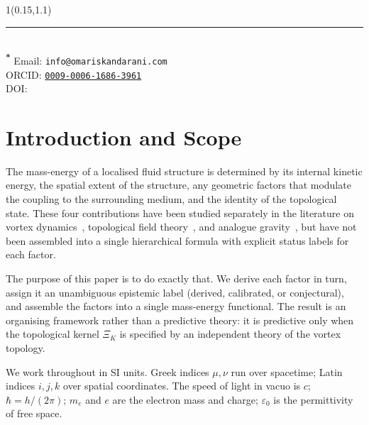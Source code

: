 \documentclass[11pt, a4paper]{article}
\begin{document}
    \begin{textblock*}{1\textwidth}(0.15\textwidth,1.1\textheight)\raggedright\footnotesize\renewcommand{\arraystretch}{1.0} \noindent\rule{\textwidth}{0.4pt}\\[0.5em]
        \textsuperscript{\textbf{*}} Email: \texttt{info@omariskandarani.com}\\
        ORCID: \texttt{\href{https://orcid.org/0009-0006-1686-3961}{0009-0006-1686-3961}}\\
        DOI: \href{https://doi.org/\paperdoi}{\paperdoi}
    \end{textblock*}

    \vfill




\section{Introduction and Scope}
\label{sec:intro}

The mass-energy of a localised fluid structure is determined by
its internal kinetic energy, the spatial extent of the
structure, any geometric factors that modulate the coupling to
the surrounding medium, and the identity of the topological
state.
These four contributions have been studied separately in the
literature on vortex dynamics~\cite{Batchelor1967,Saffman1992},
topological field theory~\cite{FaddeevNiemi1997}, and analogue
gravity~\cite{Barcelo2005}, but have not been assembled into a
single hierarchical formula with explicit status labels for
each factor.

The purpose of this paper is to do exactly that.
We derive each factor in turn, assign it an unambiguous
epistemic label (derived, calibrated, or conjectural), and
assemble the factors into a single mass-energy functional.
The result is an organising framework rather than a predictive
theory: it is predictive only when the topological kernel
$\Xi_K$ is specified by an independent theory of the vortex
topology.

We work throughout in SI units.
Greek indices $\mu,\nu$ run over spacetime; Latin indices
$i,j,k$ over spatial coordinates.
The speed of light in vacuo is $c$; $\hbar = h/(2\pi)$;
$m_e$ and $e$ are the electron mass and charge;
$\varepsilon_0$ is the permittivity of free space.

\end{document}
